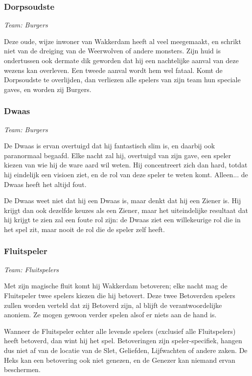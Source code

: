 \documentclass[12pt]{article}
\begin{document}
    \subsubsection{Dorpsoudste}
      \emph{\scriptsize Team: Burgers}
    
      Deze oude, wijze inwoner van Wakkerdam heeft al veel meegemaakt, en schrikt niet van de dreiging van de Weerwolven of andere monsters. Zijn huid is ondertussen ook dermate dik geworden dat hij een nachtelijke aanval van deze wezens kan overleven. Een tweede aanval wordt hem wel fataal. Komt de Dorpsoudste te overlijden, dan verliezen alle spelers van zijn team hun speciale gaves, en worden zij Burgers.
      
    \subsubsection{Dwaas}
      \emph{\scriptsize Team: Burgers}
      
      De Dwaas is ervan overtuigd dat hij fantastisch slim is, en daarbij ook paranormaal begaafd. Elke nacht zal hij, overtuigd van zijn gave, een speler kiezen van wie hij de ware aard wil weten. Hij concentreert zich dan hard, totdat hij eindelijk een visioen ziet, en de rol van deze speler te weten komt. Alleen... de Dwaas heeft het altijd fout.
      
      De Dwaas weet niet dat hij een Dwaas is, maar denkt dat hij een Ziener is. Hij krijgt dan ook dezelfde keuzes als een Ziener, maar het uiteindelijke resultaat dat hij krijgt te zien zal een foute rol zijn: de Dwaas ziet een willekeurige rol die in het spel zit, maar nooit de rol die de speler zelf heeft.

    \subsubsection{Fluitspeler}
      \emph{\scriptsize Team: Fluitspelers}
    
      Met zijn magische fluit komt hij Wakkerdam betoveren; elke nacht mag de Fluitspeler twee spelers kiezen die hij betovert. Deze twee Betoverden spelers zullen worden verteld dat zij Betoverd zijn, al blijft de verantwoordelijke anoniem. Ze mogen gewoon verder spelen alsof er niets aan de hand is.
    
      Wanneer de Fluitspeler echter alle levende spelers (exclusief alle Fluitspelers) heeft betoverd, dan wint hij het spel. Betoveringen zijn speler-specifiek, hangen dus niet af van de locatie van de Slet, Geliefden, Lijfwachten of andere zaken. De Heks kan een betovering ook niet genezen, en de Genezer kan niemand ervan beschermen.
    
\end{document}
